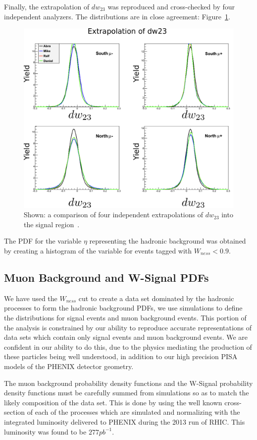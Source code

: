 Finally, the extrapolation of $dw_{23}$ was reproduced and cross-checked by four
independent analyzers. The distributions are in close agreement:
Figure~\ref{fig:four_dw23}.

\begin{figure}
  \centering
  \includegraphics[width=0.7\linewidth]{./figures/dw23_fourway.png}
  \caption{
    Shown: a comparison of four independent extrapolations of $dw_{23}$ into
    the signal region~\cite{Seidl2014a}.
  }
  \label{fig:four_dw23}
\end{figure}

The PDF for the variable $\eta$ representing the hadronic background was
obtained by creating a histogram of the variable for events tagged with
$W_{ness} < 0.9$. 

\clearpage
\subsection{Muon Background and W-Signal PDFs}
\label{sec:simulation_pdfs}

We have used the $W_{ness}$ cut to create a data set dominated by the
hadronic processes to form the hadronic background PDFs, we use simulations to
define the distributions for signal events and muon background events. This
portion of the analysis is constrained by our ability to reproduce accurate
representations of data sets which contain only signal events and muon
background events. We are confident in our ability to do this, due to the
physics mediating the production of these particles being well understood, in
addition to our high precision PISA models of the PHENIX detector geometry.

The muon background probability density functions and the W-Signal probability
density functions must be carefully summed from simulations so as to match the
likely composition of the data set. This is done by using the well known
cross-section of each of the processes which are simulated and normalizing with
the integrated luminosity delivered to PHENIX during the 2013 run of RHIC. This
luminosity was found to be $277 pb^{-1}$.

